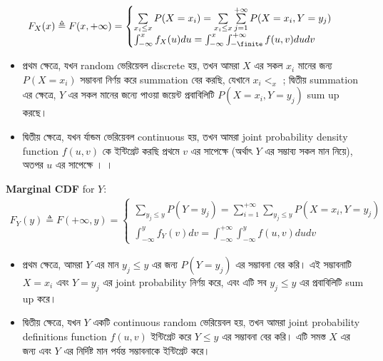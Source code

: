 \documentclass[graybox, envcountchap, twocolumn]{styles/svmult}
\begin{document}
\begin{equation}\begin{split}
F_X(x) \triangleq F(x,+\infty) = 
\begin{cases}
\sum\limits_{x_i \leq x} P(X=x_i) = \sum\limits_{x_i \leq x} \sum\limits_{j=1}^{+\infty} P(X=x_i,Y=y_j) \\
\int_{-\infty}^{x} f_X(u)du = \int_{-\infty}^{x} \int_{-\finite}^{+\infty} f(u, v) du dv
\end{cases}
\end{split}\end{equation}
\begin{itemize}
    \item {\bengalifont প্রথম ক্ষেত্রে, যখন random  ভেরিয়েবল discrete হয়, তখন আমরা $X$ এর সকল  $x_i$ মানের জন্য $P(X=x_i)$ সম্ভাবনা নির্ণয় করে summation বের করছি, যেখানে $x_i <_ x $ ; দ্বিতীয় summation এর ক্ষেত্রে, $Y$ এর সকল মানের জন্যে পাওয়া জয়েন্ট প্রবাবিলিটি  $P(X=x_i,Y=y_j)$ sum up  করছে।   }
    \item {\bengalifont দ্বিতীয় ক্ষেত্রে, যখন র্যান্ডম ভেরিয়েবল continuous হয়, তখন আমরা joint probability  density function $f(u,v)$ কে ইন্টিগ্রেট করছি প্রথমে $v$ এর সাপেক্ষে (অর্থাৎ $Y$ এর সম্ভাব্য সকল মান নিয়ে), অতপর $u$ এর সাপেক্ষে । ।}
\end{itemize}

\textbf{Marginal CDF} for $Y$:
\begin{equation}\begin{split}
F_Y(y) \triangleq F(+\infty, y) = 
\begin{cases}
\sum\limits_{y_j \leq y} P(Y=y_j) = \sum\limits_{i=1}^{+\infty} \sum\limits_{y_j \leq y} P(X=x_i,Y=y_j) \\
\int_{-\infty}^{y} f_Y(v) dv = \int_{-\infty}^{+\infty} \int_{-\infty}^{y} f(u, v) du dv
\end{cases}
\end{split}\end{equation}

\begin{itemize}
    \item {\bengalifont প্রথম ক্ষেত্রে, আমরা $Y$ এর মান $y_j \leq y$ এর জন্য $P(Y=y_j)$ এর সম্ভাবনা বের করি। এই সম্ভাবনাটি $X=x_i$ এবং $Y=y_j$ এর joint probability নির্ণয় করে, এবং এটি সব $y_j \leq y$ এর প্রবাবিলিটি sum  up করে। }
    \item {\bengalifont দ্বিতীয় ক্ষেত্রে, যখন $Y$ একটি continuous random ভেরিয়েবল হয়, তখন আমরা joint  probability definitions function  $f(u, v)$ ইন্টিগ্রেট করে $Y \leq y$ এর সম্ভাবনা বের করি। এটি সমস্ত $X$ এর জন্য এবং $Y$ এর নির্দিষ্ট মান পর্যন্ত সম্ভাবনাকে ইন্টিগ্রেট করে।}
\end{itemize}
\end{document}
